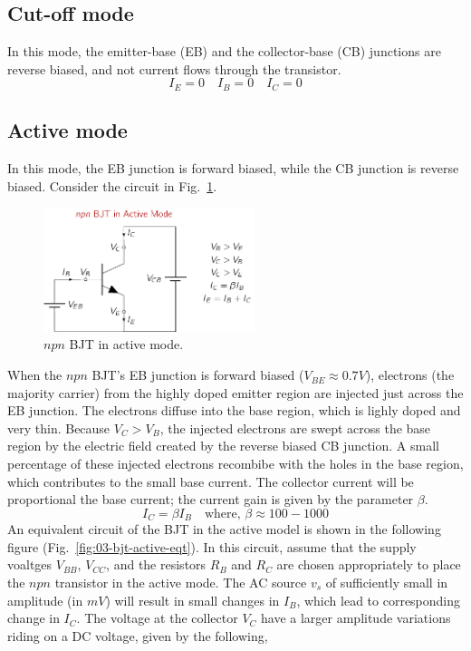 \subsection{Cut-off mode}
In this mode, the emitter-base (EB) and the collector-base (CB) junctions are reverse biased, and not current flows through the transistor.
\begin{equation}
    I_E = 0 \quad I_B = 0 \quad I_C = 0
    \label{eq:03-bjt-cutoff}
\end{equation}
\subsection{Active mode}
In this mode, the EB junction is forward biased, while the CB junction is reverse biased. Consider the circuit in Fig.~\ref{fig:03-bjt-active}.
\begin{figure}[h]
    \centering
    \includegraphics[width=0.55\textwidth]{figure/ch03/fig03-bjt-active.pdf}
    \caption{$npn$ BJT in active mode.}
    \label{fig:03-bjt-active}
\end{figure}
When the $npn$ BJT's EB junction is forward biased ($V_{BE} \approx 0.7V$), electrons (the majority carrier) from the highly doped emitter region are injected just across the EB junction. The electrons diffuse into the base region, which is lighly doped and very thin. Because $V_C > V_B$, the injected electrons are swept across the base region by the electric field created by the reverse biased CB junction. A small percentage of these injected electrons recombibe with the holes in the base region, which contributes to the small base current. The collector current will be proportional the base current; the current gain is given by the parameter $\beta$.
\begin{equation}
    I_C = \beta I_B \quad \text{where, } \beta \approx 100 - 1000
    \label{eq:03-bjt-active-ic}
\end{equation}
An equivalent circuit of the BJT in the active model is shown in the following figure (Fig.~\ref{fig:03-bjt-active-eqt}). In this circuit, assume that the supply voaltges $V_{BB}$, $V_{CC}$, and the resistors $R_B$ and $R_C$ are chosen appropriately to place the $npn$ transistor in the active mode. The AC source $v_{s}$ of sufficiently small in amplitude (in $mV$) will result in small changes in $I_B$, which lead to corresponding change in $I_C$. The voltage at the collector $V_C$ have a larger amplitude variations riding on a DC voltage, given by the following,
